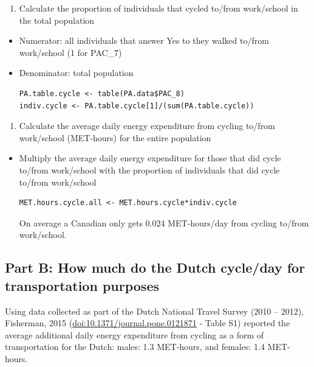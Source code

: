 \documentclass[]{book}
\providecommand{\tightlist}{%
  \setlength{\itemsep}{0pt}\setlength{\parskip}{0pt}}
\begin{document}
\begin{enumerate}
\def\labelenumi{\alph{enumi}.}
\tightlist
\item
  Calculate the proportion of individuals that cycled to/from
  work/school in the total population
\end{enumerate}

\begin{itemize}
\item
  Numerator: all individuals that answer Yes to they walked to/from
  work/school (1 for PAC\_7)
\item
  Denominator: total population

\begin{verbatim}
PA.table.cycle <- table(PA.data$PAC_8)
indiv.cycle <- PA.table.cycle[1]/(sum(PA.table.cycle))
\end{verbatim}
\end{itemize}

\begin{enumerate}
\def\labelenumi{\alph{enumi}.}
\setcounter{enumi}{1}
\tightlist
\item
  Calculate the average daily energy expenditure from cycling to/from
  work/school (MET-hours) for the entire population
\end{enumerate}

\begin{itemize}
\item
  Multiply the average daily energy expenditure for those that did cycle
  to/from work/school with the proportion of individuals that did cycle
  to/from work/school

\begin{verbatim}
MET.hours.cycle.all <- MET.hours.cycle*indiv.cycle
\end{verbatim}

  On average a Canadian only gets 0.024 MET-hours/day from cycling
  to/from work/school.
\end{itemize}

\subsection{Part B: How much do the Dutch cycle/day for transportation
purposes}\label{part-b-how-much-do-the-dutch-cycleday-for-transportation-purposes}

Using data collected as part of the Dutch National Travel Survey (2010
-- 2012), Fisherman, 2015 (\url{doi:10.1371/journal.pone.0121871} -
Table S1) reported the average additional daily energy expenditure from
cycling as a form of transportation for the Dutch: males: 1.3 MET-hours,
and females: 1.4 MET-hours.
\end{document}
